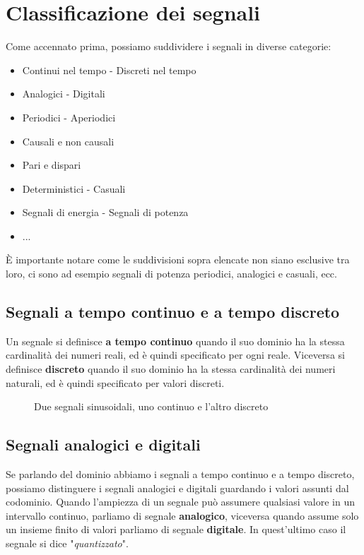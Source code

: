 \documentclass[a4paper, titlepage, oneside]{scrbook}
\begin{document}
\section{Classificazione dei segnali}
Come accennato prima, possiamo suddividere i segnali in diverse categorie:
\begin{itemize}
	\item Continui nel tempo - Discreti nel tempo
	\item Analogici - Digitali
	\item Periodici - Aperiodici
	\item Causali e non causali
	\item Pari e dispari
	\item Deterministici - Casuali
	\item Segnali di energia - Segnali di potenza
	\item ...
\end{itemize}
È importante notare come le suddivisioni sopra elencate non siano esclusive tra loro, ci sono ad esempio segnali di potenza periodici, analogici e casuali, ecc.

\subsection{Segnali a tempo continuo e a tempo discreto}
Un segnale si definisce \textbf{a tempo continuo} quando il suo dominio ha la stessa cardinalità dei numeri reali, ed è quindi specificato per ogni reale.
Viceversa si definisce \textbf{discreto} quando il suo dominio ha la stessa cardinalità dei numeri naturali, ed è quindi specificato per valori discreti.

\begin{figure}[h]
	\centering
\caption{Due segnali sinusoidali, uno continuo e l'altro discreto}
\label{fig:sinusoidi_tempo_continuo_discreto}
\end{figure}

\subsection{Segnali analogici e digitali}
Se parlando del dominio abbiamo i segnali a tempo continuo e a tempo discreto, possiamo distinguere i segnali analogici e digitali guardando i valori assunti dal codominio.
Quando l'ampiezza di un segnale può assumere qualsiasi valore in un intervallo continuo, parliamo di segnale \textbf{analogico}, viceversa quando assume solo un insieme
finito di valori parliamo di segnale \textbf{digitale}. In quest'ultimo caso il segnale si dice "\textit{quantizzato}".
\end{document}

